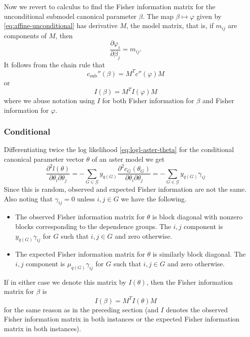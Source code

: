 Now we revert to calculus to find the Fisher information matrix for the
unconditional submodel canonical parameter $\beta$.
The map $\beta \mapsto \varphi$ given by \eqref{eq:affine-unconditional}
has derivative $M$, the model matrix, that is, if $m_{i j}$ are components
of $M$, then
$$
   \frac{\partial{\varphi_i}}{\partial \beta_j} = m_{i j}.
$$
It follows from the chain rule that
$$
   c_\text{sub}''(\beta) = M^T c''(\varphi) M
$$
or
$$
   I(\beta) = M^T I(\varphi) M
$$
where we abuse notation using $I$ for both Fisher information for $\beta$
and Fisher information for $\varphi$.

\subsubsection{Conditional}

Differentiating twice the log likelihood \eqref{eq:logl-aster-theta} for
the conditional canonical parameter vector $\theta$ of
an aster model we get
$$
   \frac{\partial^2 l(\theta)}{\partial \theta_i \partial \theta_j}
   =
   - \sum_{G \in \mathcal{G}} y_{q(G)}
   \frac{\partial^2 c_G(\theta_G)}{\partial \theta_i \partial \theta_j}
   =
   - \sum_{G \in \mathcal{G}} y_{q(G)} \gamma_{i j}
$$
Since this is random, observed and expected Fisher information are not
the same.  Also noting that $\gamma_{i j} = 0$ unless $i, j \in G$ we have
the following.
\begin{itemize}
\item The observed Fisher information matrix for $\theta$ is block diagonal
    with nonzero blocks corresponding to the dependence groups.  The $i, j$
    component is $y_{q(G)} \gamma_{i j}$ for $G$ such that $i, j \in G$ and
    zero otherwise.
\item The expected Fisher information matrix for $\theta$ is similarly
    block diagonal.  The $i, j$
    component is $\mu_{q(G)} \gamma_{i j}$ for $G$ such that $i, j \in G$ and
    zero otherwise.
\end{itemize}

If in either case we denote this matrix by $I(\theta)$, then
the Fisher information matrix for $\beta$ is
$$
   I(\beta) = M^T I(\theta) M
$$
for the same reason as in the preceding section (and $I$ denotes the observed
Fisher information matrix in both instances or the expected
Fisher information matrix in both instances).

